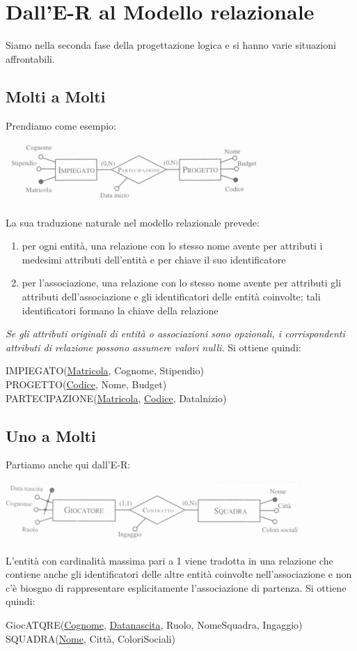 \documentclass[a4paper,12pt, oneside]{book}
\begin{document}
\section{Dall'E-R al Modello relazionale}
Siamo nella seconda fase della progettazione logica e si hanno varie situazioni affrontabili.
\subsection{Molti a Molti}
Prendiamo come esempio:
\begin{center}
\includegraphics[scale=1]{img/erre.png}
\end{center}
La sua traduzione naturale nel modello relazionale prevede:
\begin{enumerate}
\item per ogni entità, una relazione con lo stesso nome avente per attributi i medesimi
  attributi dell'entità e per chiave il suo identificatore
\item per l'associazione, una relazione con lo stesso nome avente per attributi gli attributi dell'associazione e gli identificatori delle entità coinvolte; tali identificatori
formano la chiave della relazione
\end{enumerate}
\textit{Se gli attributi originali di entità o associazioni sono opzionali, i corrispondenti
  attributi di relazione possono assumere valori nulli.}
Si ottiene quindi:
\begin{center}
IMPIEGATO(\underline{Matricola}, Cognome, Stipendio)\\
PROGETTO(\underline{Codice}, Nome, Budget)\\
PARTECIPAZIONE(\underline{Matricola}, \underline{Codice}, Datalnizio)
\end{center}
\subsection{Uno a Molti}
Partiamo anche qui dall'E-R:
\begin{center}
\includegraphics[scale=1]{img/erre2.png}
\end{center}
L'entità con cardinalità massima pari a 1 viene tradotta in una relazione
che contiene anche gli identificatori delle altre entità coinvolte nell'associazione
e non c'è biosgno di rappresentare esplicitamente l'associazione di partenza. Si ottiene quindi:
\begin{center}
GiocATQRE(\underline{Cognome}, \underline{Datanascita}, Ruolo, NomeSquadra, Ingaggio)\\
SQUADRA(\underline{Nome}, Città, ColoriSociali)
\end{center}
\end{document}
